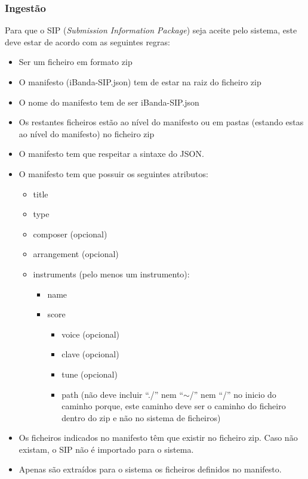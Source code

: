 \subsubsection{Ingestão}
Para que o SIP (\textit{Submission Information Package}) seja aceite pelo sistema, este deve estar de acordo com as seguintes regras:
\begin{itemize}
    \item Ser um ficheiro em formato zip
    \item O manifesto (iBanda-SIP.json) tem de estar na raiz do ficheiro zip
    \item O nome do manifesto tem de ser iBanda-SIP.json
    \item Os restantes ficheiros estão ao nível do manifesto ou em pastas (estando estas ao nível do manifesto) no ficheiro zip
    \item O manifesto tem que respeitar a sintaxe do JSON.
    \item O manifesto tem que possuir os seguintes atributos:
        \begin{itemize}
            \item title
            \item type
            \item composer (opcional)
            \item arrangement (opcional)
            \item instruments (pelo menos um instrumento):
            \begin{itemize}
               \item name
               \item score
                    \begin{itemize}
                        \item voice (opcional)
                        \item clave (opcional)
                        \item tune (opcional)
                        \item path (não deve incluir ``./'' nem ``$\sim{}$/'' nem ``/'' no inicio do caminho porque, este caminho deve ser o caminho do ficheiro dentro do zip e não no sistema de ficheiros)
                    \end{itemize}
                \end{itemize}
            \end{itemize}
    \item Os ficheiros indicados no manifesto têm que existir no ficheiro zip. Caso não existam, o SIP não é importado para o sistema.
    \item Apenas são extraídos para o sistema os ficheiros definidos no manifesto.
\end{itemize}

